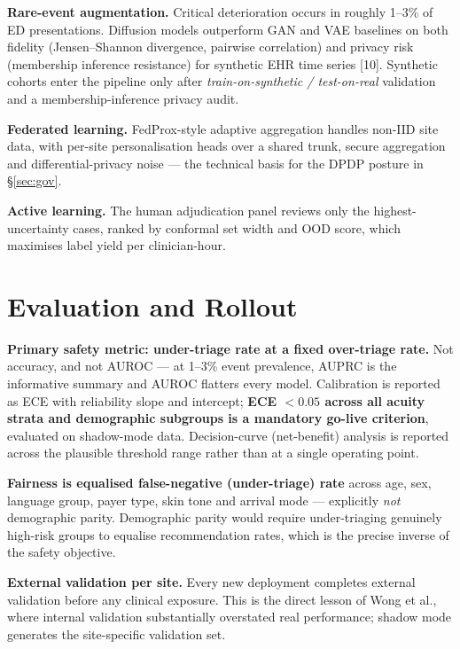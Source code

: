 \documentclass[10pt,a4paper,twocolumn]{article}
\begin{document}
\textbf{Rare-event augmentation.} Critical deterioration occurs in roughly 1--3\% of
ED presentations. Diffusion models outperform GAN and VAE baselines on both fidelity
(Jensen--Shannon divergence, pairwise correlation) and privacy risk (membership
inference resistance) for synthetic EHR time series [10]. Synthetic
cohorts enter the pipeline only after \emph{train-on-synthetic / test-on-real}
validation and a membership-inference privacy audit.

\textbf{Federated learning.} FedProx-style adaptive aggregation handles non-IID site
data, with per-site personalisation heads over a shared trunk, secure aggregation and
differential-privacy noise --- the technical basis for the DPDP posture in
\S\ref{sec:gov}.

\textbf{Active learning.} The human adjudication panel reviews only the
highest-uncertainty cases, ranked by conformal set width and OOD score, which
maximises label yield per clinician-hour.

\section{Evaluation and Rollout}
\label{sec:eval}

\textbf{Primary safety metric: under-triage rate at a fixed over-triage rate.} Not
accuracy, and not AUROC --- at 1--3\% event prevalence, AUPRC is the informative
summary and AUROC flatters every model. Calibration is reported as ECE with
reliability slope and intercept; \textbf{ECE $<0.05$ across all acuity strata and
demographic subgroups is a mandatory go-live criterion}, evaluated on shadow-mode
data. Decision-curve (net-benefit) analysis is reported across the plausible
threshold range rather than at a single operating point.

\begin{tcolorbox}[mpbox,colframe=DeepPurple]
\textbf{Fairness is equalised false-negative (under-triage) rate} across age, sex,
language group, payer type, skin tone and arrival mode --- explicitly \emph{not}
demographic parity. Demographic parity would require under-triaging genuinely
high-risk groups to equalise recommendation rates, which is the precise inverse of
the safety objective.
\end{tcolorbox}

\vspace{3pt}
\textbf{External validation per site.} Every new deployment completes external
validation before any clinical exposure. This is the direct lesson of Wong et al.,
where internal validation substantially overstated real performance; shadow mode
generates the site-specific validation set.
\end{document}
